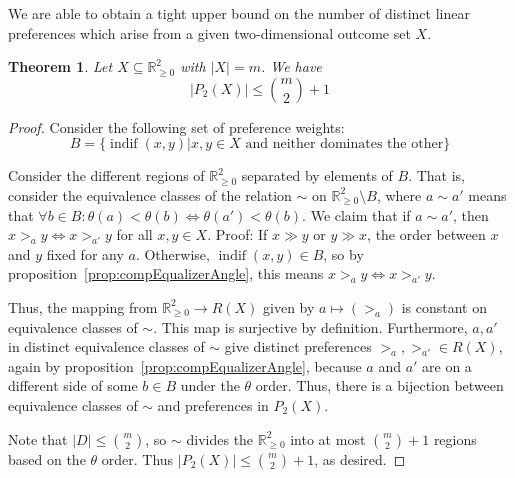 \documentclass[12pt]{article}
\newtheorem{theorem}{Theorem}
\newcommand{\Rgz}{\mathbb{R}_{\ge 0}}
\newcommand{\sizeof}[1]{\left\lvert{#1}\right\rvert}
\DeclareMathOperator*{\indif}{indif}
\newcommand{\1}[1]{\mathds{1}[{#1}]}
\begin{document}

  We are able to obtain a tight upper bound on the number of distinct linear
  preferences which arise from a given two-dimensional outcome set $X$.
  \begin{theorem} \label{thrm:maxNumberTwoD}
    Let $X\subseteq \Rgz^2$ with $|X| = m$. We have
    \[ \sizeof{P_2(X)} \leq \binom{m}{2} + 1 \]
  \end{theorem}
  \begin{proof}
    Consider the following set of preference weights:
    \[ B = \{ \indif(x,y) | x,y\in X\text{ and neither dominates the other} \} \]

    Consider the different regions of $\Rgz^2$ separated by elements of $B$.
    That is, consider the equivalence classes of the relation $\sim$
    on $\Rgz^2\setminus B$, where $a \sim a'$
    means that $\forall b\in B: \theta(a) < \theta(b) \iff \theta(a') < \theta(b)$.
    We claim that if $a\sim a'$, then $x >_a y \iff x >_{a'} y$ for all $x,y\in X$.
    Proof: If $x \gg y$ or $y \gg x$, the order between $x$ and $y$ fixed for
    any $a$. Otherwise, $\indif(x,y)\in B$, so
    by proposition~\ref{prop:compEqualizerAngle}, this means
    $x >_a y \iff x >_{a'} y$.

    Thus, the mapping from $\Rgz^2 \to R(X)$ given by $a\mapsto (>_a)$ is constant
    on equivalence classes of $\sim$. This map is surjective by definition.
    Furthermore, $a,a'$ in distinct equivalence classes of $\sim$
    give distinct preferences $>_a, >_{a'}\in R(X)$, again by
    proposition~\ref{prop:compEqualizerAngle}, because $a$ and $a'$ are on a
    different side of some $b\in B$ under the $\theta$ order.
    Thus, there is a bijection between equivalence classes of $\sim$ and
    preferences in $P_2(X)$.

    Note that $|D|\le {m \choose 2}$, so $\sim$ divides the $\Rgz^2$ into at most
    ${m \choose 2}+1$ regions based on the $\theta$ order.
    Thus $\sizeof{P_2(X)} \leq \binom{m}{2} + 1$, as desired.
  \end{proof}
\end{document}
